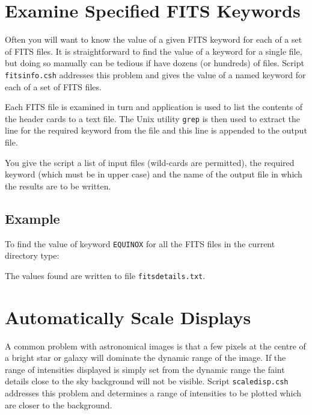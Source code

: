 \documentclass[twoside,11pt]{starlink}
\begin{document}
\newpage
\section{\label{FITSINFO}Examine Specified FITS Keywords}

Often you will want to know the value of a given FITS keyword for each
of a set of FITS files. It is straightforward to find the value of a
keyword for a single file, but doing so manually can be tedious if have
dozens (or hundreds) of files.  Script \texttt{fitsinfo.csh} addresses this
problem and gives the value of a named keyword for each of a set of FITS
files.

Each FITS file is examined in turn and   application
 is used to list the contents of
the header cards to a text file.  The Unix utility \texttt{grep} is then
used to extract the line for the required keyword from the file and
this line is appended to the output file.

You give the script a list of input files (wild-cards are permitted),
the required keyword (which must be in upper case) and the name of the
output file in which the results are to be written.

\subsection*{Example}

To find the value of keyword \texttt{EQUINOX} for all the FITS files in
the current directory type:

\begin{terminalv}
\end{terminalv}

The values found are written to file \texttt{fitsdetails.txt}.





\newpage
\section{\label{SCALEDISP}Automatically Scale Displays}

A common problem with astronomical images is that  a few pixels at the
centre of a bright star or galaxy will dominate the dynamic range of
the image.  If the range of intensities displayed is simply set from
the dynamic range the faint details close to the sky background will not
be visible.  Script \texttt{scaledisp.csh} addresses this problem and
determines a range of intensities to be plotted which are closer to the
background.
\end{document}
